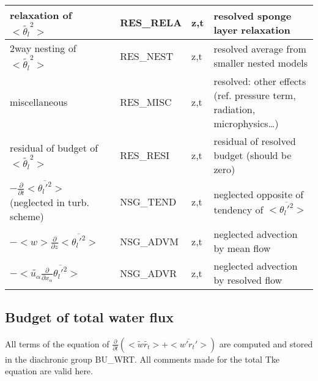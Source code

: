 \begin{longtable}[c]{|p{}|p{}|p{}|p{}|}
{\rm relaxation of }$<\tilde{\theta_l}^2>$                               & RES\_RELA  & z,t & resolved sponge layer relaxation \\\hline
{\rm 2way nesting of }$<\tilde{\theta_l}^2>$                             & RES\_NEST  & z,t & resolved average from smaller nested models \\\hline
{\rm miscellaneous}                                                      & RES\_MISC  & z,t & resolved: other effects (ref. pressure term, radiation, microphysics\ldots) \\\hline
{\rm residual of budget of} $<\tilde{\theta_l}^2>$                       & RES\_RESI  & z,t & residual of resolved budget (should be zero) \\\hline
$-\frac{\partial }{\partial t}<\overline{\theta_l'^2}>$ (neglected in turb. scheme)& NSG\_TEND & z,t & neglected opposite of tendency of $<\overline{\theta_l'^2}>$ \\\hline
$-<w>\frac{\partial}{\partial z}<\overline{\theta_l'^2}>$                & NSG\_ADVM  & z,t & neglected advection by mean flow \\\hline
$-<\tilde{u_\alpha}\frac{\partial}{\partial x_\alpha}\overline{\theta_l'^2}>$ & NSG\_ADVR & z,t & neglected advection by resolved flow \\\hline
\end{longtable}
\endgroup



\subsection{Budget of total water flux}

All terms of the equation of $\frac{\partial}{\partial t} (<\tilde{w}\tilde{r_t}> + <\overline{w'r_t'}>)$ are
computed and stored in the diachronic group BU\_WRT. 
All comments made for the total Tke equation are valid here.\\

